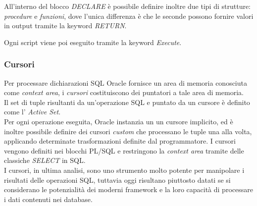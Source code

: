 All'interno del blocco \textit{DECLARE} è possibile definire inoltre due tipi di strutture: \textit{procedure} e \textit{funzioni}, dove l'unica differenza è che le seconde possono fornire valori in output tramite la keyword \textit{RETURN}.

Ogni script viene poi eseguito tramite la keyword \textit{Execute}.

\subsubsection{Cursori}
Per processare dichiarazioni SQL Oracle fornisce un area di memoria conosciuta come \textit{context area}, i \textit{cursori} costituiscono dei puntatori a tale area di memoria.\\
Il set di tuple risultanti da un'operazione SQL e puntato da un cursore è definito come l' \textit{Active Set}.\\
Per ogni operazione eseguita, Oracle instanzia un un cursore implicito, ed è inoltre possibile definire dei cursori \textit{custom} che processano le tuple una alla volta, applicando determinate trasformazioni definite dal programmatore.
I cursori vengono definiti nei blocchi PL/SQL e restringono la \textit{context area} tramite delle classiche \textit{SELECT} in SQL.\\
I cursori, in ultima analisi, sono uno strumento molto potente per manipolare i risultati delle operazioni SQL, tuttavia oggi risultano piuttosto datati se si considerano le potenzialità dei moderni \gls{framework} e la loro capacità di processare i dati contenuti nei database.
